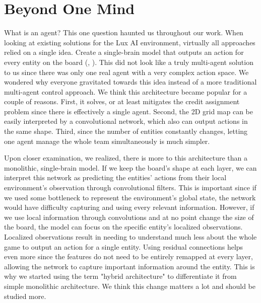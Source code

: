 \section{Beyond One Mind}
\label{ch:disc-beyond-one-mind}

\noindent What is an agent? This one question haunted us throughout our work. When looking at existing solutions for the Lux AI environment, virtually all approaches relied on a single idea. Create a single-brain model that outputs an action for every entity on the board (\cite{chen2023emergent}, \cite{ferdinand}). This did not look like a truly multi-agent solution to us since there was only one real agent with a very complex action space. We wondered why everyone gravitated towards this idea instead of a more traditional multi-agent control approach. We think this architecture became popular for a couple of reasons. First, it solves, or at least mitigates the credit assignment problem since there is effectively a single agent. Second, the 2D grid map can be easily interpreted by a convolutional network, which also can output actions in the same shape. Third, since the number of entities constantly changes, letting one agent manage the whole team simultaneously is much simpler.

\bigskip

\noindent Upon closer examination, we realized, there is more to this architecture than a monolithic, single-brain model. If we keep the board's shape at each layer, we can interpret this network as predicting the entities' actions from their local environment's observation through convolutional filters. This is important since if we used some bottleneck to represent the environment's global state, the network would have difficulty capturing and using every relevant information. However, if we use local information through convolutions and at no point change the size of the board, the model can focus on the specific entity's localized observations. Localized observations result in needing to understand much less about the whole game to output an action for a single entity. Using residual connections helps even more since the features do not need to be entirely remapped at every layer, allowing the network to capture important information around the entity. This is why we started using the term "hybrid architecture" to differentiate it from simple monolithic architecture. We think this change matters a lot and should be studied more.

\bigskip

